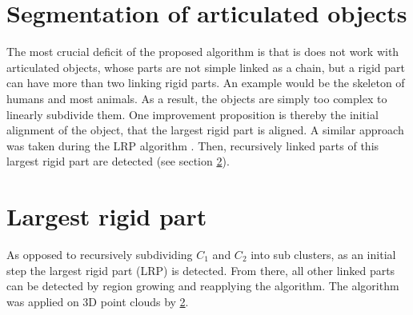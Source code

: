 

\section{Segmentation of articulated objects}
The most crucial deficit  of the proposed algorithm is that is does not work with articulated objects, whose parts are not simple linked as a chain, but a rigid part can have more than two linking rigid parts. An example would be the skeleton of humans and most animals. As a result, the objects are simply too complex to linearly subdivide them. One improvement proposition is thereby the initial alignment of the object, that the largest rigid part is aligned.  A similar approach was taken during the LRP algorithm \cite{guo2016correspondence}. Then, recursively linked parts of this largest rigid part are detected (see section \ref{LRP}).

\section{Largest rigid part}
\label{LRP}

As opposed to recursively subdividing $C_1$ and $C_2$ into sub clusters, as an initial step the largest rigid part (LRP) is detected. From there, all other linked parts can be detected by region growing and reapplying the algorithm.
The algorithm was applied on 3D point clouds by \ref{LRP}.

